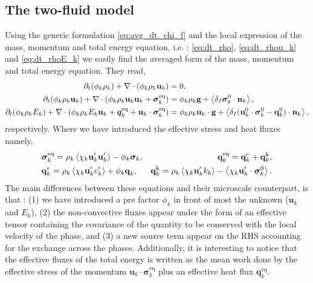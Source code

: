 \subsection{The two-fluid model}
\label{ap:two-fluid_model}

Using the generic formulation \ref{eq:avg_dt_chi_f} and the local expression of the mass, momentum and total energy equation, i.e. : \ref{eq:dt_rho}, \ref{eq:dt_rhou_k} and \ref{eq:dt_rhoE_k} we easily find the averaged form of the mass, momentum and total energy equation.
They read, 
\begin{align}
    \label{eq:dt_avg_rho}
    \partial_t (\phi_k \rho_k)  
    + \mathbf{\nabla}\cdot (
        \phi_k \rho_k\textbf{u}_k
    )
    &= 
    0,\\
    \label{eq:dt_avg_rhou_k}
    \partial_t (\phi_k \rho_k\textbf{u}_k)  
    + \mathbf{\nabla}\cdot (
        \phi_k \rho_k\textbf{u}_k\textbf{u}_k
        + \bm{\sigma}_k^\text{eq}
    )
    &= 
    \phi_k \rho_k \textbf{g} 
    +  \left<\delta_I \bm{\sigma}_k^0 \cdot \textbf{n}_k\right>,\\
    \label{eq:dt_avg_rhoE_k}
    \partial_t (\phi_k\rho_kE_k)  
    + \mathbf{\nabla}\cdot (
        \phi_k\rho_kE_k\textbf{u}_k
        + \bm{q}_k^\text{eq}
        + \textbf{u}_k \cdot \bm{\sigma}_k^\text{eq}
        )
    &= 
    \phi_k \rho_k\textbf{u}_k \cdot \textbf{g} 
    + \left<\delta_I (\textbf{u}_k^0 \cdot \bm{\sigma}_k^0 - \textbf{q}_k^0)\cdot \textbf{n}_k\right>,
\end{align} 
respectively. 
Where we have introduced the effective stress and heat fluxes namely, 
\begin{align*}
    &\bm{\sigma}_k^\text{eq}
    = 
     \rho_k\avg{\chi_k \textbf{u}_k'\textbf{u}_k'}
      - \phi_k \bm{\sigma}_k,%
    &\textbf{q}_k^\text{eq}
    =\textbf{q}_k^\text{e} +\textbf{q}_k^\text{k},  \\
    &\textbf{q}_k^\text{e}
    = \rho_k \avg{\chi_k\textbf{u}_k' e_k'} 
    + \phi_k\textbf{q}_k,
    &\textbf{q}_k^\text{k}
    = \rho_k \avg{\chi_k \textbf{u}_k' k_k} 
    - \avg{\chi_k \textbf{u}_k' \cdot \bm{\sigma}_k^0}.
\end{align*}
The main differences between these equations and their microscale counterpart, is that : 
(1) we have introduced a pre factor $\phi_k$ in front of most the unknown  ($\textbf{u}_k$ and $E_k$), 
(2) the non-convective fluxes appear under the form of an effective tensor containing the covariance of the quantity to be conserved with the local velocity of the phase, 
and (3) a new source term appear on the RHS accounting for the exchange across the phases. 
Additionally, it is interesting to notice that the effective fluxes of the total energy is written as the mean work done by the effective stress of the momentum $\textbf{u}_k \cdot \bm{\sigma}_k^\text{eq}$ plus an effective heat flux $\bm{q}_k^\text{eq}$. 

